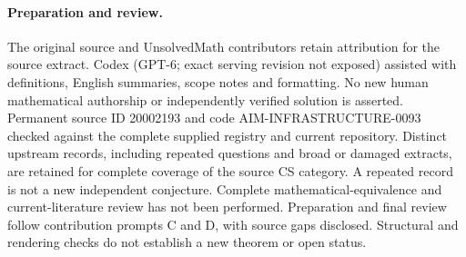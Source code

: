 \documentclass[11pt]{article}
\begin{document}
\paragraph{Preparation and review.}
The original source and UnsolvedMath contributors retain attribution for the source extract. Codex (GPT-6; exact serving revision not exposed) assisted with definitions, English summaries, scope notes and formatting. No new human mathematical authorship or independently verified solution is asserted. Permanent source ID 20002193 and code AIM-INFRASTRUCTURE-0093 checked against the complete supplied registry and current repository. Distinct upstream records, including repeated questions and broad or damaged extracts, are retained for complete coverage of the source CS category. A repeated record is not a new independent conjecture. Complete mathematical-equivalence and current-literature review has not been performed. Preparation and final review follow contribution prompts C and D, with source gaps disclosed. Structural and rendering checks do not establish a new theorem or open status.
\label{end:20002193}
\end{document}
